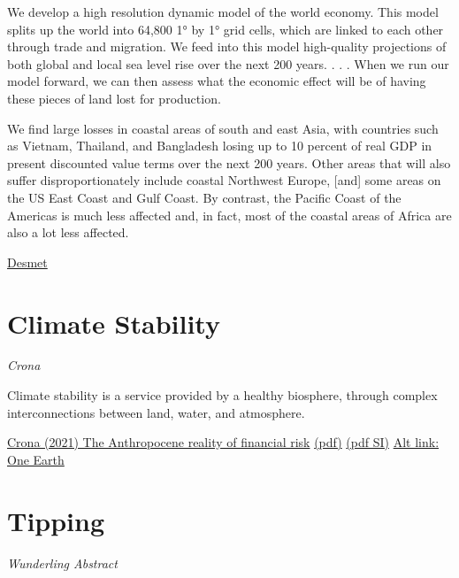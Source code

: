 \documentclass[
]{book}
\begin{document}
We develop a high resolution dynamic model of the world economy. This model splits up the world into 64,800 1° by 1° grid cells, which are linked to each other through trade and migration. We feed into this model high-quality projections of both global and local sea level rise over the next 200 years. . . . When we run our model forward, we can then assess what the economic effect will be of having these pieces of land lost for production.

We find large losses in coastal areas of south and east Asia, with countries such as Vietnam, Thailand, and Bangladesh losing up to 10 percent of real GDP in present discounted value terms over the next 200 years. Other areas that will also suffer disproportionately include coastal Northwest Europe, {[}and{]} some areas on the US East Coast and Gulf Coast. By contrast, the Pacific Coast of the Americas is much less affected and, in fact, most of the coastal areas of Africa are also a lot less affected.

\href{https://www.aeaweb.org/research/klaus-desmet-migration-climate-change}{Desmet}

\hypertarget{climate-stability}{%
\chapter{Climate Stability}\label{climate-stability}}

\emph{Crona}

Climate stability is a service provided by a healthy biosphere,
through complex interconnections between land, water, and
atmosphere.

\href{https://www.sciencedirect.com/science\%20/article/pii/S2590332221002359\#undfig1}{Crona (2021) The Anthropocene reality of financial risk}
\href{pdf/Crona_2021_Anthropocene_reality_of\%20Financial_Risk.pdf}{(pdf)}
\href{pdf/Crona_2021_Anthropocene_reality_of\%20Financial_Risk_SI.pdf}{(pdf SI)}
\href{https://www.cell.com/one-earth/fulltext/S2590-3322(21)00235-9?_returnURL=\%20https\%3A\%2F\%2Flinkinghub.elsevier.com\%2Fretrieve\%2Fpii\%2FS2590332221002359\%3Fshowall\%3Dtrue}{Alt link: One Earth}

\hypertarget{tipping}{%
\chapter{Tipping}\label{tipping}}

\emph{Wunderling Abstract}
\end{document}
